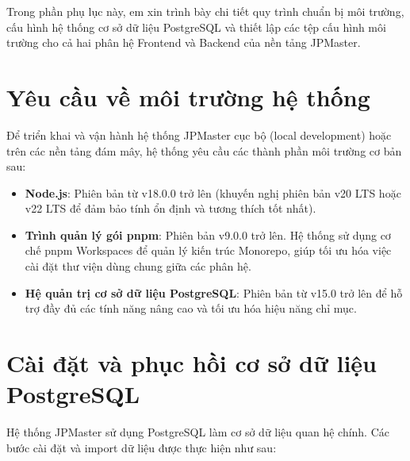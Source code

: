 \documentclass[../DoAn.tex]{subfiles}
\begin{document}
\lstset{breaklines=true, basicstyle=\ttfamily\small}

Trong phần phụ lục này, em xin trình bày chi tiết quy trình chuẩn bị môi trường, cấu hình hệ thống cơ sở dữ liệu PostgreSQL và thiết lập các tệp cấu hình môi trường cho cả hai phân hệ Frontend và Backend của nền tảng JPMaster.

\section{Yêu cầu về môi trường hệ thống}
Để triển khai và vận hành hệ thống JPMaster cục bộ (local development) hoặc trên các nền tảng đám mây, hệ thống yêu cầu các thành phần môi trường cơ bản sau:
\begin{itemize}
    \item \textbf{Node.js}: Phiên bản từ v18.0.0 trở lên (khuyến nghị phiên bản v20 LTS hoặc v22 LTS để đảm bảo tính ổn định và tương thích tốt nhất).
    \item \textbf{Trình quản lý gói pnpm}: Phiên bản v9.0.0 trở lên. Hệ thống sử dụng cơ chế pnpm Workspaces để quản lý kiến trúc Monorepo, giúp tối ưu hóa việc cài đặt thư viện dùng chung giữa các phân hệ.
    \item \textbf{Hệ quản trị cơ sở dữ liệu PostgreSQL}: Phiên bản từ v15.0 trở lên để hỗ trợ đầy đủ các tính năng nâng cao và tối ưu hóa hiệu năng chỉ mục.
\end{itemize}

\section{Cài đặt và phục hồi cơ sở dữ liệu PostgreSQL}
Hệ thống JPMaster sử dụng PostgreSQL làm cơ sở dữ liệu quan hệ chính. Các bước cài đặt và import dữ liệu được thực hiện như sau:
\end{document}
